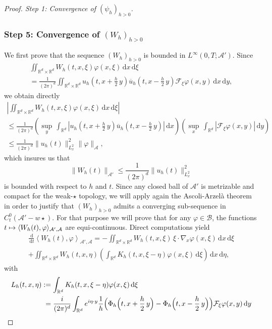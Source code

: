 \documentclass[JEP,XML,SOM,NoEqCountersInSection,NoFloatCountersInSection,Unicode,published]{cedram}
\newcommand\mto{\mathchoice{\longmapsto}{\mapsto}{\mapsto}{\mapsto}}
\let\bar\oldbar
\theoremstyle{definition}
\let\bar\overline
\newcommand{\R}{\mathbb{R}}
\newcommand{\ud}{\, {\mathrm{d}}}
\begin{document}
\begin{proof}[Proof. Step 1: Convergence of $(\psi_{h})_{h>0}$]
\subsubsection*{Step 5: Convergence of $(W_{h})_{h>0}$} We first prove that the sequence $(W_{h})_{h>0}$ is bounded in $L^{\infty}\left(0,T;\mathcal{A}'\right)$. Since
\begin{multline*}
\iint_{\R^{d}\times\R^{d}}W_{h}(t,x,\xi)\varphi(x,\xi)\ud x\ud \xi\\
=\frac{1}{(2\pi)^{d}}\iint_{\R^{d}\times\R^{d}}u_{h}(t,x+\frac{h}{2}\,y)\bar{u}_{h}(t,x-\frac{h}{2}\,y)\mathcal{F}_{\xi}\varphi(x,y)\ud x\ud y,
\end{multline*}
we obtain directly
\begin{multline*}
\left|\iint_{\R^{d}\times\R^{d}}W_{h}(t,x,\xi)\varphi(x,\xi)\ud x\ud \xi\right|\\
\leq\frac{1}{(2\pi)^{d}}\left(\underset{y}{\sup}\,\int_{\R^{d}}\left|u_{h}(t,x+\frac{h}{2}\,y)\bar{u}_{h}(t,x-\frac{h}{2}\,y)\right|\ud x\right)\left(\underset{x}{\sup}\,\int_{\R^{d}}|\mathcal{F}_{\xi}\varphi(x,y)|\ud y\right)\\
\leq\frac{1}{(2\pi)^{d}}\|u_{h}(t)\|_{L_{x}^{2}}^{2}\|\varphi\|_{\mathcal{A}},
\end{multline*}
which insures us that
\[
\|W_{h}(t)\|_{\mathcal{A}'}\leq\frac{1}{(2\pi)^{d}}\|u_{h}(t)\|_{L_{x}^{2}}^{2}
\]
is bounded with respect to $h$ and $t$. Since any closed ball of $\mathcal{A}'$ is metrizable and compact for the weak-$\star$ topology, we will apply again the Ascoli-Arzelà theorem in order to justify that $(W_{h})_{h>0}$ admits a converging sub-sequence in $C_{t}^{0}(\mathcal{A}'-w\star)$. For that purpose we will prove that for any $\varphi\in\mathcal{B}$, the functions $t\mto \langle W_{h}(t),\varphi\rangle_{\mathcal{A}',\mathcal{A}}$ are equi-continuous. Direct computations yield
\begin{multline}\label{eq_on_Wh}
\frac{\ud}{\ud t}\left\langle W_{h}(t),\varphi\right\rangle_{\mathcal{A}',\mathcal{A}}=-\iint_{\R^{d}\times\R^{d}}W_{h}(t,x,\xi)\,\xi\cdot\nabla_{x}\varphi(x,\xi)\ud x\ud\xi\\
+\iint_{\R^{d}\times\R^{d}}W_{h}(t,x,\eta)\left(\int_{\R^{d}}K_{h}(t,x,\xi-\eta)\varphi(x,\xi)\ud\xi\right)\ud x\ud\eta,
\end{multline}
with
\begin{align*}
L_{h}(t,x,\eta)&:=\int_{\R^{d}}K_{h}(t,x,\xi-\eta)\varphi(x,\xi)\ud\xi\\
&\hphantom{:}=\frac{i}{(2\pi)^{d}}\int_{\R^{d}}e^{i\eta\cdot y}\frac{1}{h}\Bigl(\Phi_{h}\Bigl(t,x+\frac{h}{2}\,y\Bigr)-\Phi_{h}\Bigl(t,x-\frac{h}{2}\,y\Bigr)\Bigr)\mathcal{F}_{\xi}\varphi(x,y)\ud y

\end{align*}
\end{proof}
\end{document}
